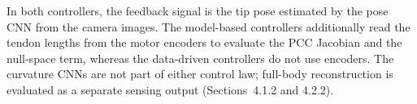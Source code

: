 In both controllers, the feedback signal is the tip pose estimated by the pose CNN from the camera images. The model-based controllers additionally read the tendon lengths from the motor encoders to evaluate the PCC Jacobian and the null-space term, whereas the data-driven controllers do not use encoders. The curvature CNNs are not part of either control law; full-body reconstruction is evaluated as a separate sensing output (Sections~4.1.2 and 4.2.2).
